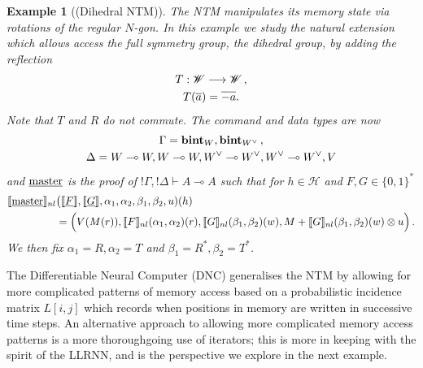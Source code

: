 \documentclass[english,letter paper,12pt,leqno]{article}
\theoremstyle{example}
\newtheorem{example}[theorem]{Example}
\numberwithin{equation}{section}
\begin{document}
\begin{example}[(Dihedral NTM)]\label{example:dihedral} The NTM manipulates its memory state via rotations of the regular $N$-gon. In this example we study the natural extension which allows access the full symmetry group, the dihedral group, by adding the reflection
\begin{gather*}
T: \mathscr{W} \longrightarrow \mathscr{W}\,,\\
T(\overline{a}) = \overline{-a}.
\end{gather*}
Note that $T$ and $R$ do not commute. The command and data types are now
\begin{gather*}
\Gamma = \textbf{bint}_W, \textbf{bint}_{W^{\vee}}\,,\\
\Delta = W \multimap W, W \multimap W, W^{\vee} \multimap W^{\vee}, W^{\vee} \multimap W^{\vee}, V
\end{gather*}
and $\underline{\textup{master}}$ is the proof of ${!} \Gamma, {!} \Delta \vdash A \multimap A$ such that for $h \in \mathscr{H}$ and $F,G \in \{0,1\}^*$
\begin{align*}
\llbracket \underline{\textup{master}} \rrbracket_{nl}&\big( \llbracket \underline{F} \rrbracket, \llbracket \underline{G} \rrbracket, \alpha_1, \alpha_2, \beta_1, \beta_2, u )(h)\\
& = \Big(V(M(r)), \llbracket F \rrbracket_{nl}(\alpha_1,\alpha_2)(r),\llbracket G \rrbracket_{nl}(\beta_1,\beta_2)(w), M + \llbracket G \rrbracket_{nl}(\beta_1,\beta_2)(w) \otimes u\Big)\,.
\end{align*}
We then fix $\alpha_1 = R, \alpha_2 = T$ and $\beta_1 = R^*, \beta_2 = T^*$.
\end{example}

The Differentiable Neural Computer (DNC) \cite{dnc} generalises the NTM by allowing for more complicated patterns of memory access based on a probabilistic incidence matrix $L[i,j]$ which records when positions in memory are written in successive time steps. An alternative approach to allowing more complicated memory access patterns is a more thoroughgoing use of iterators; this is more in keeping with the spirit of the LLRNN, and is the perspective we explore in the next example.
\end{document}
